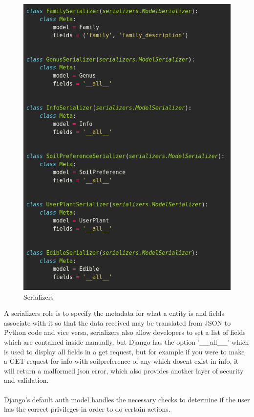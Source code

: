 \documentclass{article}
\begin{document}
     \begin{figure}[!htb]
        \centering
        \caption{Serializers}
        \includegraphics[scale=0.40]{serializers2}
    \end{figure}
    
    A serializers role is to specify the metadata for what a entity is and fields associate with it so that the data received may be translated from JSON to Python code and vice versa, serializers also allow developers to set a list of fields which are contained inside manually, but Django has the option '\_\_all\_\_' which is used to display all fields in a get request, but for example if you were to make a GET request for info with soilpreference of any  which dosent exist in info, it will return a malformed json error, which also provides another layer of security and validation.
    \\
    \\
    Django's default auth model handles the necessary checks to determine if the user has the correct privileges in order to do certain actions. 
    \newpage
   
\end{document}
